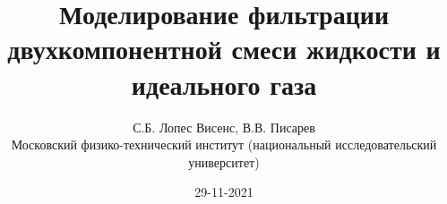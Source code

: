 \documentclass[aspectratio=169]{beamer}
\author{С.Б. Лопес Висенс, В.В. Писарев\\
\small{Московский физико-технический институт (национальный исследовательский университет)} }
\title{Моделирование фильтрации двухкомпонентной смеси жидкости и идеального газа}
\date{29-11-2021}
\begin{document}
\maketitle
\Large



% 



\end{document}
